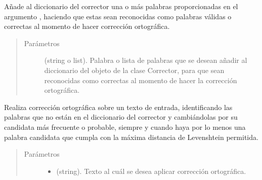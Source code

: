 \documentclass[letterpaper,10pt,openany,spanish]{sphinxmanual}
\begin{document}
\begin{fulllineitems}

\begin{fulllineitems}
\label{\detokenize{funciones/correccion:correccion.Corrector.agregar_palabras}}
Añade al diccionario del corrector una o más palabras proporcionadas en el argumento             , haciendo que estas sean reconocidas como palabras válidas o             correctas al momento de hacer corrección ortográfica.
\begin{quote}\begin{description}
\item[{Parámetros}] \leavevmode
{} \textendash{} (string o list). Palabra o lista de palabras que se desean añadir al             diccionario del objeto de la clase Corrector, para que sean reconocidas como             correctas al momento de hacer la corrección ortográfica.

\end{description}\end{quote}

\end{fulllineitems}


\begin{fulllineitems}
\label{\detokenize{funciones/correccion:correccion.Corrector.correccion_ortografia}}
Realiza corrección ortográfica sobre un texto de entrada, identificando las palabras             que no están en el diccionario del corrector y cambiándolas por su candidata más             frecuente o probable, siempre y cuando haya por lo menos una palabra candidata             que cumpla con la máxima distancia de Levenshtein permitida.
\begin{quote}\begin{description}
\item[{Parámetros}] \leavevmode\begin{itemize}
\item {} 
 \textendash{} (string). Texto al cuál se desea aplicar corrección ortográfica.


\end{itemize}
\end{description}
\end{quote}
\end{fulllineitems}
\end{fulllineitems}
\end{document}
